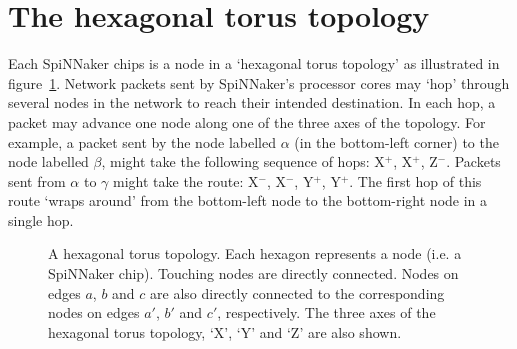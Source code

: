 	
	\section{The hexagonal torus topology}
		
		Each SpiNNaker chips is a node in a `hexagonal torus topology' as
		illustrated in figure~\ref{fig:hexagonalTorusTopology}. Network packets
		sent by SpiNNaker's processor cores may `hop' through several nodes in the
		network to reach their intended destination. In each hop, a packet may
		advance one node along one of the three axes of the topology. For example,
		a packet sent by the node labelled $\alpha$ (in the bottom-left corner) to
		the node labelled $\beta$, might take the following sequence of hops:
		X$^+$, X$^+$, Z$^-$. Packets sent from $\alpha$ to $\gamma$ might take the
		route: X$^-$, X$^-$, Y$^+$, Y$^+$. The first hop of this route `wraps
		around' from the bottom-left node to the bottom-right node in a single hop.
		
		\begin{figure}
			\center
			
			\caption{A hexagonal torus topology. Each hexagon represents a node (i.e.
			a SpiNNaker chip). Touching nodes are directly connected. Nodes on edges
			$a$, $b$ and $c$ are also directly connected to the corresponding nodes
			on edges $a'$, $b'$ and $c'$, respectively. The three axes of the
			hexagonal torus topology, `X', `Y' and `Z' are also shown.}
			\label{fig:hexagonalTorusTopology}
		\end{figure}
		
